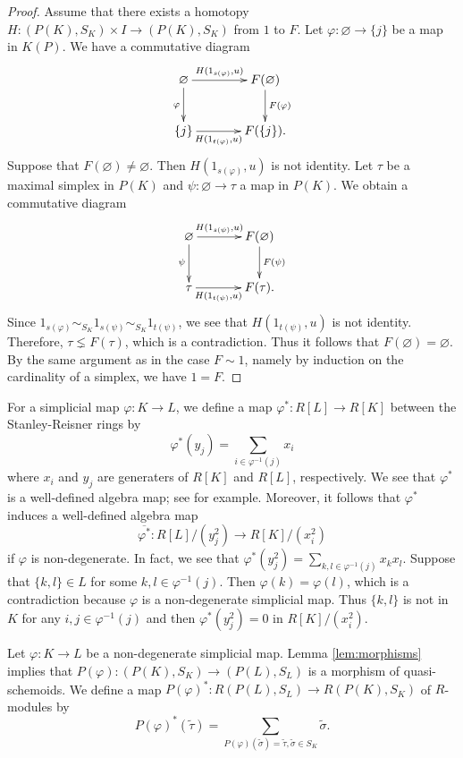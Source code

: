 \documentclass{amsart}
\theoremstyle{definition}
\theoremstyle{remark}
\newcommand{\K}{R}%
\begin{document}
\begin{proof}
Assume that there exists a homotopy $H :  (P(K), S_K) \times I \to (P(K), S_K)$ from $1$ to $F$. 
Let $\varphi : \varnothing \to \{j\}$ be a map in $K(P)$. We have a commutative diagram 
$$
\xymatrix@C35pt@R25pt{
\varnothing  \ar@{->}[r]^-{H(1_{s(\varphi)}, u)}  \ar@{->}[d]_{\varphi} &  F(\varnothing) \ar@{->}[d]^{F(\varphi)}\\
\{j\} \ar@{->}[r]_-{H(1_{t(\varphi)}, u)} &  F(\{j\}). }
$$
Suppose that $F(\varnothing) \neq \varnothing$. Then $H(1_{s(\varphi)}, u)$ is not identity. Let $\tau$ be a maximal simplex in 
$P(K)$ and $\psi : \varnothing \to \tau$ a map in $P(K)$. We obtain a commutative diagram 
$$
\xymatrix@C35pt@R25pt{
\varnothing  \ar@{->}[r]^-{H(1_{s(\psi)}, u)}  \ar@{->}[d]_{\psi} &  F(\varnothing) \ar@{->}[d]^{F(\psi)}\\
\tau\ar@{->}[r]_-{H(1_{t(\psi)}, u)} &  F(\tau). }
$$
Since $1_{s(\varphi)} \sim_{S_K} 1_{s(\psi)} \sim_{S_K} 1_{t(\psi)}$, we see that  $H(1_{t(\psi)}, u)$ is not identity. 
Therefore, $\tau \lneq F(\tau)$, which is a contradiction. Thus it follows that $F(\varnothing) =\varnothing$. 
By the same argument as in the case $F\sim 1$, namely by induction on the cardinality of a simplex, we have $1 = F$.  
\end{proof}

For a simplicial map $\varphi: K \to L$, 
we define a map $\varphi^* : \K[L] \to \K[K]$ between the Stanley-Reisner rings by 
$$
\varphi^*(y_j) = \sum_{i \in \varphi^{-1}(j)} x_i
$$ 
where $x_i$ and $y_j$ are generaters of  $\K[K]$ and $\K[L]$, respectively.  We see that $\varphi^*$ is a well-defined algebra map; see \cite[Proposition 3.4]{B-P} for example. Moreover, it follows that $\varphi^*$ induces a well-defined algebra map 
$$
\overline{\varphi^*} : \K[L]/(y_j^2) \to \K[K]/(x_i^2)
$$
if $\varphi$ is non-degenerate. In fact, we see that $\varphi^*(y_j^2)= \sum_{k,l \in \varphi^{-1}(j)}x_kx_l$. Suppose that $\{k, l\} \in L$ for some $k, l \in \varphi^{-1}(j)$. Then $\varphi(k) = \varphi(l)$, which is a contradiction because $\varphi$ is a non-degenerate simplicial map. Thus $\{k, l\}$ is not in $K$ for any $i, j \in \varphi^{-1}(j)$ and then $\varphi^*(y_j^2)=0$ in $\K[K]/(x_i^2)$. 

Let $\varphi : K \to L$ be a non-degenerate simplicial map.  Lemma \ref{lem:morphisms} implies that 
$P(\varphi) : (P(K), S_K) \to (P(L), S_L)$ is a morphism of quasi-schemoids. 
We define a map $P(\varphi)^* : \K(P(L), S_L) \to \K(P(K), S_K)$ of $\K$-modules by 
$$
P(\varphi)^*(\widetilde{\tau}) = \sum_{P(\varphi)(\widetilde{\sigma}) = \widetilde{\tau}, 
\widetilde{\sigma} \in S_K} \widetilde{\sigma}.
$$
\end{document}
